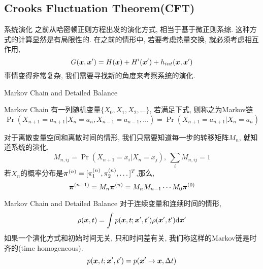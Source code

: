     \subsection{Crooks Fluctuation Theorem(CFT)}
    \begin{frame}{系统演化}
        之前从哈密顿正则方程出发的演化方式, 相当于基于微正则系综. 这种方式的计算显然是有局限性的. 在之前的情形中, 若要考虑热量交换, 就必须考虑相互作用,
        \begin{equation}
            G(\vb*x,\vb*x') = H(\vb*x) + H'(\vb*x') + h_{int}(\vb*x,\vb*x')        
        \end{equation}
        事情变得非常复杂, 我们需要寻找新的角度来考察系统的演化.
    \end{frame}
    \begin{frame}{Markov Chain and Detailed Balance}
        \begin{block}{Markov Chain}
            有一列随机变量$\{X_0,X_1,X_2,\dots\}$, 若满足下式, 则称之为Markov链
            \begin{equation}
                \Pr(X_{n+1}=a_{n+1} | X_{n} = a_n, X_{n-1} = a_{n-1},\dots) = \Pr(X_{n+1}=a_{n+1} | X_{n} = a_n)
            \end{equation}
        \end{block}
        对于离散变量空间和离散时间的情形, 我们只需要知道每一步的转移矩阵$M_n$, 就知道系统的演化,
        \begin{equation}
            M_{n,ij} = \Pr(X_{n+1} = x_i| X_n = x_j),\ \sum_i M_{n,ij} = 1
        \end{equation}
        若$X_n$的概率分布是$\vb*\pi^{(n)} = [\pi^{(n)}_1,\pi^{(n)}_2,\dots]^T$,那么,
        \begin{equation}
            \vb*\pi^{(n+1)} = M_n \vb*\pi^{(n)} = M_nM_{n-1}\cdots M_0\vb*\pi^{(0)}
        \end{equation}
    \end{frame}
    \begin{frame}{Markov Chain and Detailed Balance}
        对于连续变量和连续时间的情形,
        \begin{equation}
            \rho(\vb*x, t) = \int p(\vb*x,t; \vb*x', t') \rho(\vb*x', t')\dd\vb*x'
        \end{equation}
        如果一个演化方式和初始时间无关, 只和时间差有关, 我们称这样的Markov链是时齐的(time homogeneous).
        \begin{equation}
            p(\vb*x,t; \vb*x',t') = p(\vb*x'\to\vb*x, \Delta t)
        \end{equation}
    \end{frame}
